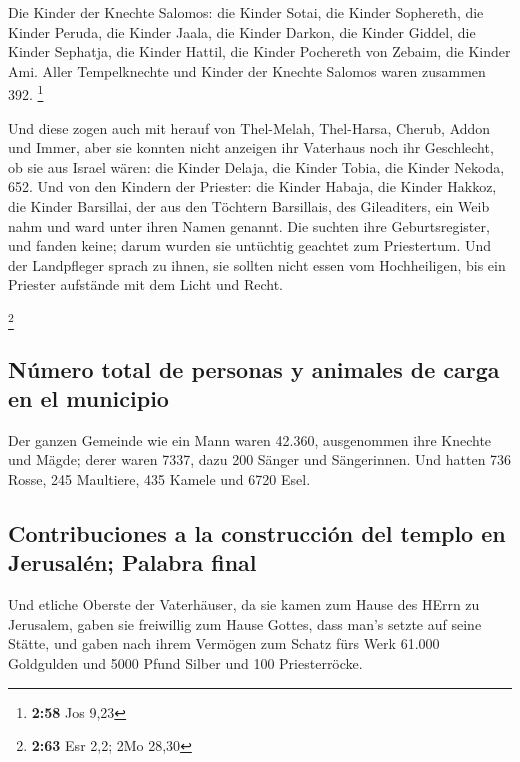  Die Kinder der Knechte Salomos: die Kinder Sotai, die
Kinder Sophereth, die Kinder Peruda,  die Kinder Jaala,
die Kinder Darkon, die Kinder Giddel,  die Kinder
Sephatja, die Kinder Hattil, die Kinder Pochereth von Zebaim, die Kinder
Ami.  Aller Tempelknechte und Kinder der Knechte Salomos
waren zusammen 392. \footnote{\textbf{2:58} Jos 9,23}

 Und diese zogen auch mit herauf von Thel-Melah,
Thel-Harsa, Cherub, Addon und Immer, aber sie konnten nicht anzeigen ihr
Vaterhaus noch ihr Geschlecht, ob sie aus Israel wären: 
die Kinder Delaja, die Kinder Tobia, die Kinder Nekoda, 652.
 Und von den Kindern der Priester: die Kinder Habaja, die
Kinder Hakkoz, die Kinder Barsillai, der aus den Töchtern Barsillais,
des Gileaditers, ein Weib nahm und ward unter ihren Namen genannt.
 Die suchten ihre Geburtsregister, und fanden keine;
darum wurden sie untüchtig geachtet zum Priestertum.  Und
der Landpfleger sprach zu ihnen, sie sollten nicht essen vom
Hochheiligen, bis ein Priester aufstände mit dem Licht und Recht.

\footnote{\textbf{2:63} Esr 2,2; 2Mo 28,30}

\hypertarget{nuxfamero-total-de-personas-y-animales-de-carga-en-el-municipio}{%
\subsection{Número total de personas y animales de carga en el
municipio}\label{nuxfamero-total-de-personas-y-animales-de-carga-en-el-municipio}}

 Der ganzen Gemeinde wie ein Mann waren 42.360,
 ausgenommen ihre Knechte und Mägde; derer waren 7337,
dazu 200 Sänger und Sängerinnen.  Und hatten 736 Rosse,
245 Maultiere,  435 Kamele und 6720 Esel.

\hypertarget{contribuciones-a-la-construcciuxf3n-del-templo-en-jerusaluxe9n-palabra-final}{%
\subsection{Contribuciones a la construcción del templo en Jerusalén;
Palabra
final}\label{contribuciones-a-la-construcciuxf3n-del-templo-en-jerusaluxe9n-palabra-final}}

 Und etliche Oberste der Vaterhäuser, da sie kamen zum
Hause des HErrn zu Jerusalem, gaben sie freiwillig zum Hause Gottes,
dass man's setzte auf seine Stätte,  und gaben nach ihrem
Vermögen zum Schatz fürs Werk 61.000 Goldgulden und 5000 Pfund Silber
und 100 Priesterröcke.


